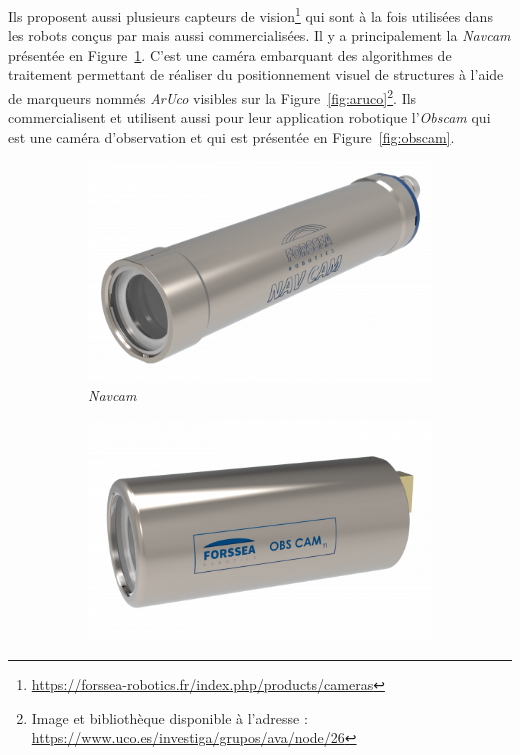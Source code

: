 			Ils proposent aussi plusieurs capteurs de vision\footnote{\url{https://forssea-robotics.fr/index.php/products/cameras}} qui sont à la fois utilisées dans les robots conçus par \forssea{} mais aussi commercialisées. Il y a principalement la \textit{Navcam} présentée en Figure~\ref{fig:navcam}. C'est une caméra embarquant des algorithmes de traitement permettant de réaliser du positionnement visuel de structures à l'aide de marqueurs nommés \textit{ArUco} visibles sur la Figure~\ref{fig:aruco}\footnote{Image et bibliothèque disponible à l'adresse : \url{https://www.uco.es/investiga/grupos/ava/node/26}}. Ils commercialisent et utilisent aussi pour leur application robotique l'\textit{Obscam} qui est une caméra d'observation et qui est présentée en Figure~\ref{fig:obscam}.

			\begin{figure}[!htb]
				\centering
				\begin{subfigure}[t]{0.33\textwidth}
					\centering
					\includegraphics[width=\textwidth]{imgs/navcam.png}
					\caption{\textit{Navcam}}
					\label{fig:navcam}
				\end{subfigure}
				\hfill
				\begin{subfigure}[t]{0.33\textwidth}
					\centering
					\includegraphics[width=\textwidth]{imgs/obscam.png}

\end{subfigure}
\end{figure}
